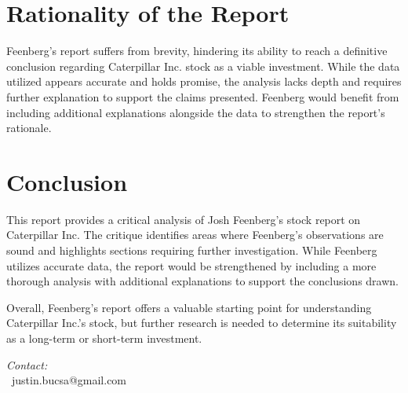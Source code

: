 \documentclass[9pt,a4paper,twoside]{tau}
\begin{document}
\section{Rationality of the Report}

    Feenberg's report suffers from brevity, hindering its ability to reach a definitive conclusion regarding Caterpillar Inc. stock as a viable investment. While the data utilized appears accurate and holds promise, the analysis lacks depth and requires further explanation to support the claims presented. Feenberg would benefit from including additional explanations alongside the data to strengthen the report's rationale. 

\section{Conclusion}
    This report provides a critical analysis of Josh Feenberg's stock report on Caterpillar Inc. The critique identifies areas where Feenberg's observations are sound and highlights sections requiring further investigation. While Feenberg utilizes accurate data, the report would be strengthened by including a more thorough analysis with additional explanations to support the conclusions drawn.

    Overall, Feenberg's report offers a valuable starting point for understanding Caterpillar Inc.'s stock, but further research is needed to determine its suitability as a long-term or short-term investment.


        

\printbibliography


\begin{center}
	\vskip10pt
	\vskip10pt
	\textit{Contact:} \\
	\faEnvelope[regular]\ justin.bucsa@gmail.com \\
\end{center}


\end{document}
